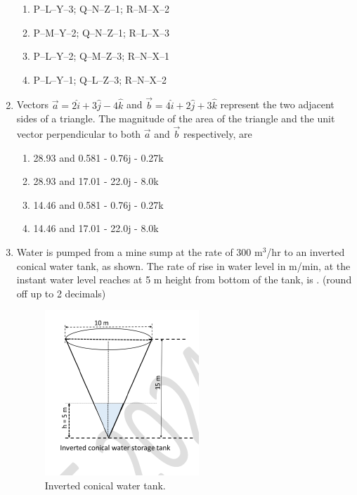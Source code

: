 \documentclass[journal]{IEEEtran}
\begin{document}
\begin{enumerate}[leftmargin=0pt]

\begin{enumerate}
  \item P--L--Y--3; Q--N--Z--1; R--M--X--2
  \item P--M--Y--2; Q--N--Z--1; R--L--X--3
  \item P--L--Y--2; Q--M--Z--3; R--N--X--1
  \item P--L--Y--1; Q--L--Z--3; R--N--X--2
\end{enumerate}


\hfill{}


\item Vectors $\vec{a} = 2 \hat{i} + 3 \hat{j} - 4 \hat{k}$ and $\vec{b} = 4 \hat{i} + 2 \hat{j} + 3 \hat{k}$ represent the two adjacent sides of a triangle. The magnitude of the area of the triangle and the unit vector perpendicular to both $\vec{a}$ and $\vec{b}$ respectively, are
\begin{enumerate}
\item 28.93 and 0.581 - 0.76j - 0.27k
\item 28.93 and 17.01 - 22.0j - 8.0k
\item 14.46 and 0.581 - 0.76j - 0.27k
\item 14.46 and 17.01 - 22.0j - 8.0k
\end{enumerate}
\hfill{}
\item Water is pumped from a mine sump at the rate of 300 m$^3$/hr to an inverted conical water tank, as shown. The rate of rise in water level in m/min, at the instant water level reaches at 5 m height from bottom of the tank, is \underline{\hspace{1.5cm}}. (round off up to 2 decimals)
\begin{figure}[H]  %
  \centering
  \includegraphics[width=0.5\linewidth]{figs/inverted.png}
  \caption{Inverted conical water tank.}\label{fig:tank}
\end{figure}


\end{enumerate}
\end{document}

